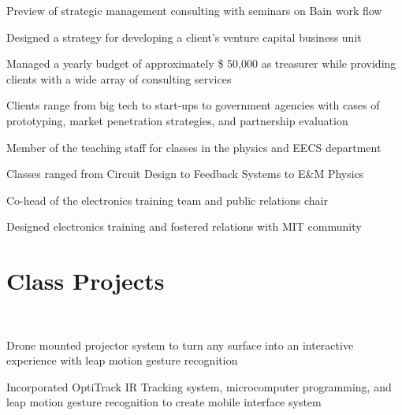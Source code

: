 \documentclass[letterpaper, article]{deedy-resume-openfont}
\begin{document}
\begin{minipage}[t]{0.66\textwidth}
\begin{tightemize}
	\item Preview of strategic management consulting with seminars on Bain work flow
	\item Designed a strategy for developing a client's venture capital business unit
\end{tightemize}
\sectionsep

\begin{tightemize}
	\item Managed a yearly budget of approximately \$ 50,000 as treasurer while providing clients with a wide array of consulting services
	\item Clients range from big tech to start-ups to government agencies with cases of prototyping, market penetration strategies, and partnership evaluation
\end{tightemize}
\sectionsep

\begin{tightemize}
	\item Member of the teaching staff for classes in the physics and EECS department
	\item Classes ranged from Circuit Design to Feedback Systems to E\&M Physics
\end{tightemize}
\sectionsep

\begin{tightemize}
	\item Co-head of the electronics training team and public relations chair
	\item Designed electronics training and fostered relations with MIT community
\end{tightemize}


\section{Class Projects}
\\
\begin{tightemize}
	\item Drone mounted projector system to turn any surface into an interactive experience with leap motion gesture recognition
	\item Incorporated OptiTrack IR Tracking system, microcomputer programming, and leap motion gesture recognition to create mobile interface system
\end{tightemize}


\end{minipage}
\end{document}
